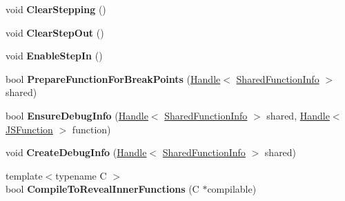 \begin{DoxyCompactItemize}
\item 
void {\bfseries Clear\+Stepping} ()\hypertarget{classv8_1_1internal_1_1_debug_adcd9304fbc680273541c9a4d78109dab}{}\label{classv8_1_1internal_1_1_debug_adcd9304fbc680273541c9a4d78109dab}

\item 
void {\bfseries Clear\+Step\+Out} ()\hypertarget{classv8_1_1internal_1_1_debug_af5090ea1782837407d64a584904c11d0}{}\label{classv8_1_1internal_1_1_debug_af5090ea1782837407d64a584904c11d0}

\item 
void {\bfseries Enable\+Step\+In} ()\hypertarget{classv8_1_1internal_1_1_debug_af729ba3172ea24d1c8b097ad1d7b623b}{}\label{classv8_1_1internal_1_1_debug_af729ba3172ea24d1c8b097ad1d7b623b}

\item 
bool {\bfseries Prepare\+Function\+For\+Break\+Points} (\hyperlink{classv8_1_1internal_1_1_handle}{Handle}$<$ \hyperlink{classv8_1_1internal_1_1_shared_function_info}{Shared\+Function\+Info} $>$ shared)\hypertarget{classv8_1_1internal_1_1_debug_af97d41166b96c6c287d6775c1ef26790}{}\label{classv8_1_1internal_1_1_debug_af97d41166b96c6c287d6775c1ef26790}

\item 
bool {\bfseries Ensure\+Debug\+Info} (\hyperlink{classv8_1_1internal_1_1_handle}{Handle}$<$ \hyperlink{classv8_1_1internal_1_1_shared_function_info}{Shared\+Function\+Info} $>$ shared, \hyperlink{classv8_1_1internal_1_1_handle}{Handle}$<$ \hyperlink{classv8_1_1internal_1_1_j_s_function}{J\+S\+Function} $>$ function)\hypertarget{classv8_1_1internal_1_1_debug_a2b5827bbb925b95345d16a10c827b791}{}\label{classv8_1_1internal_1_1_debug_a2b5827bbb925b95345d16a10c827b791}

\item 
void {\bfseries Create\+Debug\+Info} (\hyperlink{classv8_1_1internal_1_1_handle}{Handle}$<$ \hyperlink{classv8_1_1internal_1_1_shared_function_info}{Shared\+Function\+Info} $>$ shared)\hypertarget{classv8_1_1internal_1_1_debug_a9b995df86bffeb5059bc13e51168e6c0}{}\label{classv8_1_1internal_1_1_debug_a9b995df86bffeb5059bc13e51168e6c0}

\item 
{\footnotesize template$<$typename C $>$ }\\bool {\bfseries Compile\+To\+Reveal\+Inner\+Functions} (C $\ast$compilable)\hypertarget{classv8_1_1internal_1_1_debug_a96c9c04efac489f4067d84e1695ca38f}{}\label{classv8_1_1internal_1_1_debug_a96c9c04efac489f4067d84e1695ca38f}


\end{DoxyCompactItemize}
